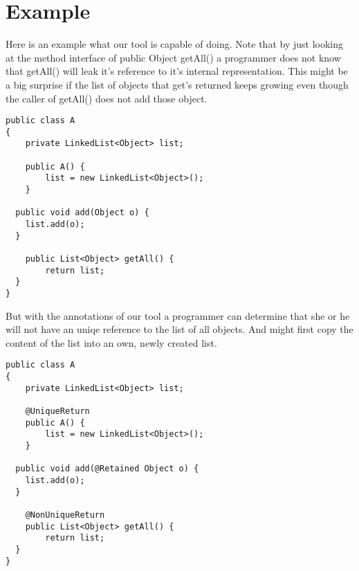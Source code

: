 \section{Example}

Here is an example what our tool is capable of doing.
Note that by just looking at the method interface of 
public Object getAll() a programmer does not know
that getAll() will leak it's reference to it's
internal representation. This might be a big surprise
if the list of objects that get's returned keeps growing
even though the caller of getAll() does not add those object.


\begin{lstlisting}
public class A
{
	private LinkedList<Object> list;
		
	public A() {
		list = new LinkedList<Object>();
	}
		
  public void add(Object o) {
   	list.add(o);
  }
    
	public List<Object> getAll() {
		return list;
  }
}
\end{lstlisting}

But with the annotations of our tool a programmer can 
determine that she or he will not have an uniqe reference
to the list of all objects. And might first copy the content 
of the list into an own, newly created list.

\begin{lstlisting}
public class A
{
	private LinkedList<Object> list;
	
	@UniqueReturn
	public A() {
		list = new LinkedList<Object>();
	}
		
  public void add(@Retained Object o) {
   	list.add(o);
  }
  
	@NonUniqueReturn
	public List<Object> getAll() {
		return list;
  }
}
\end{lstlisting}